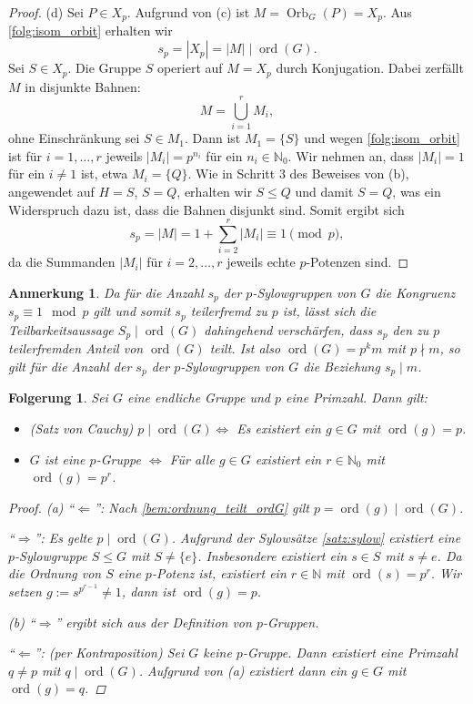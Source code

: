 \documentclass[a4paper, twoside, 11pt, ngerman]{report}
\newcommand{\NN}{\mathds N}
\DeclareMathOperator{\Orb}{Orb}
\DeclareMathOperator{\ord}{ord}
\theoremstyle{definistyle}
\newtheorem{anm}[satz]{Anmerkung}
\newtheorem{folgerung}[satz]{Folgerung}
\theoremstyle{remark}
\begin{document}
\begin{proof}
(d) Sei $P \in X_p$.  Aufgrund von (c) ist $M = \Orb_G(P)=X_p$. Aus \ref{folg:isom_orbit} erhalten wir
\[
s_p = |X_p| = |M| \mid \ord(G).
\]
Sei $S \in X_p$. Die Gruppe $S$ operiert auf $M = X_p$ durch Konjugation. Dabei zerfällt $M$ in disjunkte Bahnen:
\[
M = \bigcup_{i=1}^r M_i,
\]
ohne Einschränkung sei $S \in M_1$. Dann ist $M_1 = \{S\}$ und wegen \ref{folg:isom_orbit} ist für $i=1,\ldots,r$ jeweils
$|M_i| = p^{n_i}$ für ein $n_i\in\NN_0$. Wir nehmen an, dass $|M_i| = 1$ für ein $i \neq 1$ ist, etwa $M_i = \{Q\}$. 
Wie in Schritt 3 des Beweises von (b), angewendet auf $H=S$, $S=Q$, erhalten wir $S\leq Q$ und damit $S=Q$,
was ein Widerspruch dazu ist, dass die Bahnen disjunkt sind.
Somit ergibt sich
\[
s_p = |M| = 1 + \sum_{i=2}^r |M_i| \equiv 1 \pmod{p},
\]
da die Summanden $|M_i|$ für $i=2,\ldots,r$ jeweils echte $p$-Potenzen sind.
\end{proof}

\begin{anm}\label{anm:sylow_anzahlen}
Da für die Anzahl $s_p$ der $p$-Sylowgruppen von $G$ die Kongruenz $s_p\equiv 1\mod p$ gilt und somit $s_p$ teilerfremd zu $p$ ist, lässt sich die Teilbarkeitsaussage $S_p\mid\ord(G)$ dahingehend verschärfen, dass $s_p$ den zu $p$ teilerfremden
Anteil von $\ord(G)$ teilt. Ist also $\ord(G)=p^km$ mit $p\nmid m$, so gilt für die Anzahl der $s_p$ der $p$-Sylowgruppen
von $G$ die Beziehung $s_p\mid m$.
\end{anm}

\begin{folgerung}\label{folgerung:satz_von_cauchy}
Sei $G$ eine endliche Gruppe und $p$ eine Primzahl. Dann gilt:
\begin{itemize}
\item[(a)] (Satz von Cauchy) $p \mid \ord(G) \iff$ Es existiert ein $g \in G$ mit $\ord(g) = p$.
\item[(b)] $G$ ist eine $p$-Gruppe $\iff$ Für alle $g \in G$ existiert ein $r \in \NN_0$ mit $\ord(g) = p^r$.
\end{itemize}
\begin{proof}
(a) "`$\Leftarrow$"': Nach \ref{bem:ordnung_teilt_ordG} gilt $p = \ord(g) \mid \ord(G)$.

"`$\Rightarrow$"': Es gelte $p \mid \ord(G)$. Aufgrund der Sylowsätze \ref{satz:sylow} existiert eine $p$-Sylowgruppe $S \leq G$ mit $S \neq \{e\}$. Insbesondere existiert ein $s \in S$ mit $s \neq e$.
Da die Ordnung von $S$ eine $p$-Potenz ist, existiert ein $r\in\NN$ mit $\ord(s) = p^r$. Wir setzen $g := s^{p^{r-1}} \neq 1$, dann ist $\ord(g) = p$.

(b) "`$\Rightarrow$"' ergibt sich aus der Definition von $p$-Gruppen.

"`$\Leftarrow$"': (per Kontraposition) Sei $G$ keine $p$-Gruppe. Dann existiert eine Primzahl $q \neq p$ mit $q \mid \ord(G)$. Aufgrund von (a) existiert dann ein $g \in G$ mit $\ord(g) = q$.
\end{proof}
\end{folgerung}
\end{document}
